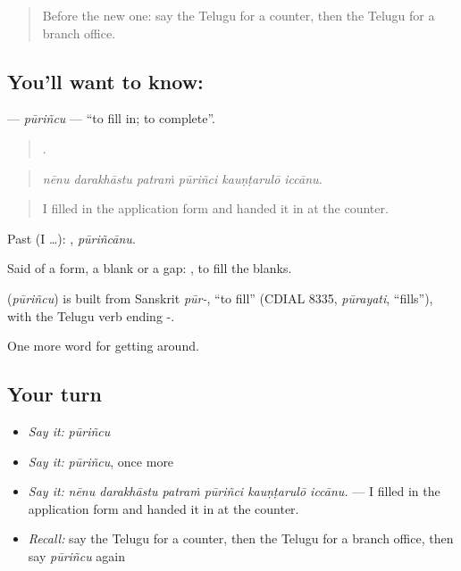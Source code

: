 \label{lesson:TE-C462-purincu}



\begin{quote}
Before the new one: say the Telugu for a counter, then the Telugu for a branch office.
\end{quote}

\subsection*{You'll want to know: }
\textbf{} — \emph{pūriñcu} — \textquotedblleft{}to fill in; to complete\textquotedblright{}.

\begin{quote}
     .
\end{quote}

\begin{quote}
\emph{nēnu darakhāstu patraṁ pūriñci kauṇṭarulō iccānu.}
\end{quote}

\begin{quote}
I filled in the application form and handed it in at the counter.
\end{quote}

Past (I …): , \emph{pūriñcānu}.

Said of a form, a blank or a gap:  , to fill the blanks.

\begin{cousinweb}
\textbf{} (\emph{pūriñcu}) is built from Sanskrit \emph{pūr-}, \textquotedblleft{}to fill\textquotedblright{} (CDIAL 8335, \emph{pūrayati}, \textquotedblleft{}fills\textquotedblright{}), with the Telugu verb ending -.
\end{cousinweb}

\begin{grammarlens}[title={What you've built}]
One more word for getting around.
\end{grammarlens}

\subsection*{Your turn}
\begin{itemize}
\raggedright
  \item \emph{Say it:} \emph{pūriñcu}
  \item \emph{Say it:} \emph{pūriñcu}, once more
  \item \emph{Say it:} \emph{nēnu darakhāstu patraṁ pūriñci kauṇṭarulō iccānu.} — I filled in the application form and handed it in at the counter.
  \item \emph{Recall:} say the Telugu for a counter, then the Telugu for a branch office, then say \emph{pūriñcu} again
\end{itemize}

